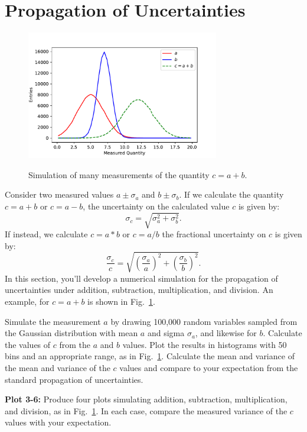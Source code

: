 \section{Propagation of Uncertainties}

\begin{figure}[htbp]
\begin{center}
\includegraphics[width=0.75\textwidth]{figs/labs/uncertainties/addunc.pdf}\\
\end{center}
\caption{\label{fig:addunc} Simulation of many measurements of the quantity $c = a + b$. }
\end{figure}

Consider two measured values $a \pm \sigma_a$ and $b \pm \sigma_b$.  If we calculate the quantity $c = a + b$ or $c = a - b$, the uncertainty on the calculated value $c$ is given by:
\begin{displaymath}
\sigma_c = \sqrt{\sigma_a^2 + \sigma_b^2}.
\end{displaymath}
If instead, we calculate $c = a * b$ or $c = a/b$ the fractional uncertainty on $c$ is given by:
\begin{displaymath}
\frac{\sigma_c}{c} = \sqrt{\left(\frac{\sigma_a}{a}\right)^2 + \left(\frac{\sigma_b}{b}\right)^2}.
\end{displaymath}
In this section, you'll develop a numerical simulation for the
propagation of uncertainties under addition, subtraction,
multiplication, and division.  An example, for $c = a + b$ is shown in Fig.~\ref{fig:addunc}.

Simulate the measurement $a$ by drawing 100,000 random variables
sampled from the Gaussian distribution with mean $a$ and sigma
$\sigma_a$, and likewise for $b$.  Calculate the values of $c$ from
the $a$ and $b$ values.  Plot the results in histograms with 50 bins and an appropriate range, as in Fig.~\ref{fig:addunc}.  Calculate the mean and variance of the mean and variance of the $c$ values and compare to your expectation from the standard propagation of uncertainties.

{\bf Plot 3-6:}  Produce four plots simulating addition, subtraction, multiplication, and division, as in Fig.~\ref{fig:addunc}.  In each case, compare the measured variance of the $c$ values with your expectation.






























